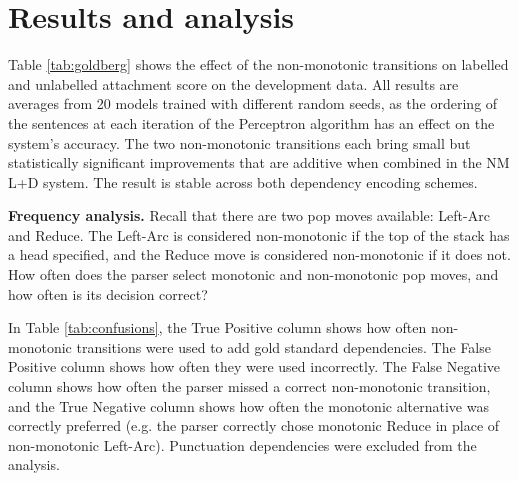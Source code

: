 \documentclass[11pt,letterpaper]{article}
\begin{document}




\section{Results and analysis}
\label{sec:results}

Table \ref{tab:goldberg} shows the effect of the non-monotonic transitions on
labelled and unlabelled attachment score on the development data.
All results are averages from 20 models
trained with different random seeds, as the ordering of the sentences at each iteration
of the Perceptron algorithm has an effect on the system's accuracy.
The two non-monotonic transitions each bring small but statistically significant
improvements that are additive when combined in the NM L+D system.
The result is stable across both dependency encoding schemes.

\noindent \textbf{Frequency analysis.} 
Recall that there are two pop moves available: Left-Arc and Reduce.
The Left-Arc is considered non-monotonic if the top of the stack has a head specified,
and the Reduce move is considered non-monotonic if it does not. How often does the
parser select monotonic and non-monotonic pop moves, and how often is its decision
correct?

In Table \ref{tab:confusions}, the True Positive column shows how often
non-monotonic transitions were used to add gold standard dependencies. The False
Positive column shows how often they were used incorrectly.
The False Negative column shows how often the parser missed a correct
non-monotonic transition, and the True Negative column shows how often the monotonic
alternative was correctly preferred (e.g. the parser correctly chose monotonic
Reduce in place of non-monotonic Left-Arc). Punctuation dependencies were excluded
from the analysis.
\end{document}
